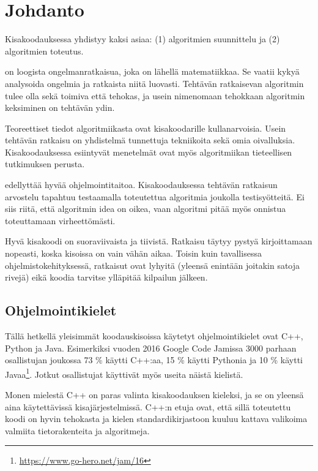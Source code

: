 \chapter{Johdanto}

Kisakoodauksessa yhdistyy kaksi asiaa:
(1) algoritmien suunnittelu ja
(2) algoritmien toteutus.

 on loogista ongelmanratkaisua,
joka on lähellä matematiikkaa.
Se vaatii kykyä analysoida ongelmia ja
ratkaista niitä luovasti.
Tehtävän ratkaisevan algoritmin tulee olla sekä
toimiva että tehokas,
ja usein nimenomaan tehokkaan algoritmin
keksiminen on tehtävän ydin.

Teoreettiset tiedot algoritmiikasta
ovat kisakoodarille kullanarvoisia.
Usein tehtävän ratkaisu on yhdistelmä tunnettuja
tekniikoita sekä omia oivalluksia.
Kisakoodauksessa esiintyvät menetelmät ovat myös
algoritmiikan tieteellisen tutkimuksen perusta.

 edellyttää hyvää ohjelmointitaitoa.
Kisakoodauksessa tehtävän ratkaisun arvostelu tapahtuu
testaamalla toteutettua algoritmia
joukolla testisyötteitä.
Ei siis riitä, että algoritmin idea on oikea,
vaan algoritmi pitää myös onnistua toteuttamaan virheettömästi.

Hyvä kisakoodi on suoraviivaista ja tiivistä.
Ratkaisu täytyy pystyä kirjoittamaan nopeasti,
koska kisoissa on vain vähän aikaa.
Toisin kuin tavallisessa ohjelmistokehityksessä,
ratkaisut ovat lyhyitä
(yleensä enintään joitakin satoja rivejä)
eikä koodia tarvitse ylläpitää kilpailun jälkeen.

\section{Ohjelmointikielet}


Tällä hetkellä yleisimmät koodauskisoissa
käytetyt ohjelmointikielet ovat C++, Python ja Java.
Esimerkiksi vuoden 2016 Google Code Jamissa
3000 parhaan osallistujan joukossa
73 \% käytti C++:aa,
15 \% käytti Pythonia ja
10 \% käytti Javaa\footnote{\url{https://www.go-hero.net/jam/16}}.
Jotkut osallistujat käyttivät myös useita näistä kielistä.

Monen mielestä C++ on paras
valinta kisakoodauksen kieleksi,
ja se on yleensä aina käytettävissä
kisajärjestelmissä.
C++:n etuja ovat, että sillä
toteutettu koodi on hyvin tehokasta
ja kielen standardikirjastoon
kuuluu kattava valikoima valmiita
tietorakenteita ja algoritmeja.

